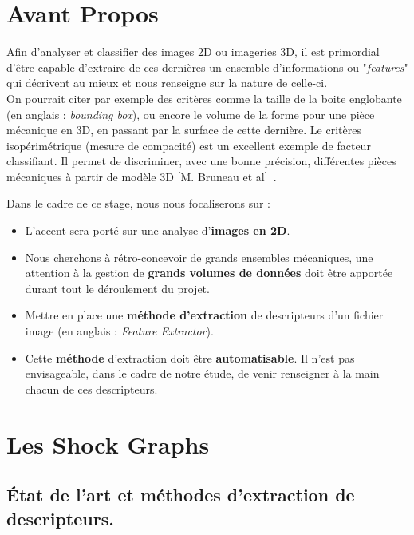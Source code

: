 \section*{Avant Propos}

Afin d'analyser et classifier des images 2D ou imageries 3D, il est primordial d'être capable d'extraire de ces dernières un ensemble d'informations ou "\textit{features}" qui décrivent au mieux et nous renseigne sur la nature de celle-ci.\\
On pourrait citer par exemple des critères comme la taille de la boite englobante (en anglais : \textit{bounding box}), ou encore le volume de la forme pour une pièce mécanique en 3D, en passant par la surface de cette dernière. Le critères isopérimétrique (mesure de compacité) est un excellent exemple de facteur classifiant. Il permet de discriminer, avec une bonne précision, différentes pièces mécaniques à partir de modèle 3D [M. Bruneau et al]~\cite{Bruneau2014}.

Dans le cadre de ce stage, nous nous focaliserons sur :\\
\begin{itemize}
	\item	L'accent sera porté sur une analyse d'\textbf{images en 2D}.\\
	\item	Nous cherchons à rétro-concevoir de grands ensembles mécaniques, une attention à la gestion de \textbf{grands volumes de données} doit être apportée durant tout le déroulement du projet.\\
	\item	Mettre en place une \textbf{méthode d'extraction} de descripteurs d'un fichier image (en anglais : \textit{Feature Extractor}).\\
	\item	Cette \textbf{méthode} d'extraction doit être \textbf{automatisable}. Il n'est pas envisageable, dans le cadre de notre étude, de venir renseigner à la main chacun de ces descripteurs.	
\end{itemize}
\vspace{3mm}
  

\section{Les Shock Graphs}

\subsection{État de l'art et méthodes d'extraction de descripteurs.}

